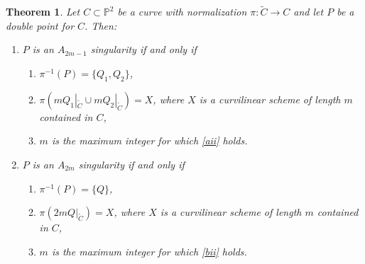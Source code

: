 \documentclass[draft]{amsart}
\newtheorem{thm}{Theorem}[section]
\theoremstyle{definition}
\theoremstyle{remark}
\theoremstyle{definition}
\begin{document}
\begin{thm}\label{2mtom notrat}   Let $ C \subset \mathbb{P}^2$ be a curve with normalization $\pi: \tilde C \to C$ and let $P$ be a double point for $C$. Then:
 \begin{enumerate}%
\item\label{a} $P$ is an $A_{2m-1}$ singularity if and only if
\begin{enumerate}%
 \item\label{ai}  $\pi^{-1}(P) = \{Q_1, Q_2\} $,
 \item\label{aii}  $\pi (mQ_1|_{\tilde C}\cup mQ_2|_{\tilde C})= X $, where $X$ is a curvilinear scheme of length $m$ contained in $C$,
 \item\label{aiii}  $m$ is the maximum integer for which \eqref{aii} holds.
\end{enumerate}

\item\label{b}  $P$ is an $A_{2m}$ singularity if and only if
\begin{enumerate}%
\item\label{bi} $\pi^{-1}(P) = \{Q \}$,
\item\label{bii} $\pi (2mQ|_{\tilde C}) = X $, where $X$ is a curvilinear scheme of length $m$ contained in $C$,
\item\label{biii}  $m$ is the maximum integer for which \eqref{bii} holds.
\end{enumerate}

\end{enumerate}
\end{thm}
\end{document}

